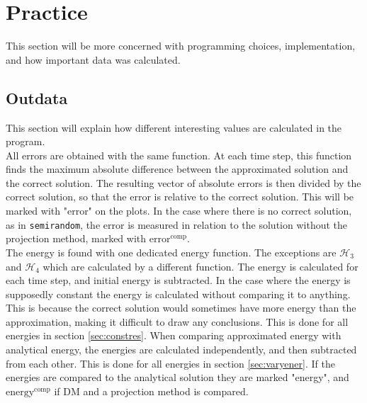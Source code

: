 \chapter{Practice}%
This section will be more concerned with programming choices, implementation, and how important data was calculated.

\section{Outdata} %
This section will explain how different interesting values are calculated in the program. \\

All errors are obtained with the same function. At each time step, this function finds the maximum absolute difference between the approximated solution and the correct solution. The resulting vector of absolute errors is then divided by the correct solution, so that the error is relative to the correct solution. This will be marked with "error" on the plots. In the case where there is no correct solution, as in \texttt{semirandom}, the error is measured in relation to the solution without the projection method, marked with $\text{error}^{\text{comp}}$. \\

The energy is found with one dedicated energy function. The exceptions are $\mathcal{H}_3$ and $\mathcal{H}_4$ which are calculated by a different function. The energy is calculated for each time step, and initial energy is subtracted. In the case where the energy is supposedly constant the energy is calculated without comparing it to anything. This is because the correct solution would sometimes have more energy than the approximation, making it difficult to draw any conclusions. This is done for all energies in section \ref{sec:constres}. When comparing approximated energy with analytical energy, the energies are calculated independently, and then subtracted from each other. This is done for all energies in section \ref{sec:varyener}. If the energies are compared to the analytical solution they are marked "energy", and $\text{energy}^{\text{comp}}$ if DM and a projection method is compared. \\

